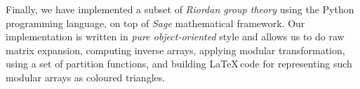 Finally, we have implemented a subset of \emph{Riordan group theory} using the
Python programming language, on top of \emph{Sage} mathematical framework.  Our
implementation is written in \emph{pure object-oriented} style and allows us to
do raw matrix expansion, computing inverse arrays, applying modular
    transformation, using a set of partition functions, and building \LaTeX\,code
    for representing such modular arrays as coloured triangles.
